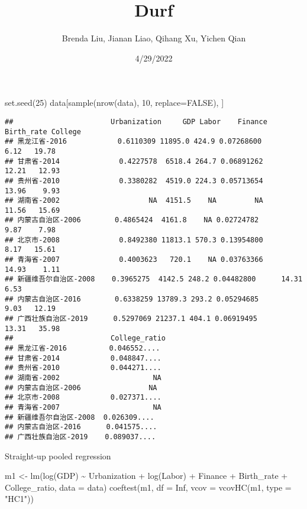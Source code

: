 \documentclass[
]{article}
\title{Durf}
\author{Brenda Liu, Jianan Liao, Qihang Xu, Yichen Qian}
\date{4/29/2022}
\newenvironment{Shaded}{\begin{snugshade}}{\end{snugshade}}
\newcommand{\AttributeTok}[1]{\textcolor[rgb]{0.77,0.63,0.00}{#1}}
\newcommand{\ConstantTok}[1]{\textcolor[rgb]{0.00,0.00,0.00}{#1}}
\newcommand{\DecValTok}[1]{\textcolor[rgb]{0.00,0.00,0.81}{#1}}
\newcommand{\FunctionTok}[1]{\textcolor[rgb]{0.00,0.00,0.00}{#1}}
\newcommand{\NormalTok}[1]{#1}
\newcommand{\OtherTok}[1]{\textcolor[rgb]{0.56,0.35,0.01}{#1}}
\newcommand{\SpecialCharTok}[1]{\textcolor[rgb]{0.00,0.00,0.00}{#1}}
\newcommand{\StringTok}[1]{\textcolor[rgb]{0.31,0.60,0.02}{#1}}
\begin{document}
\maketitle

\begin{Shaded}
\begin{Highlighting}[]
\FunctionTok{set.seed}\NormalTok{(}\DecValTok{25}\NormalTok{)}
\NormalTok{data[}\FunctionTok{sample}\NormalTok{(}\FunctionTok{nrow}\NormalTok{(data), }\DecValTok{10}\NormalTok{, }\AttributeTok{replace=}\ConstantTok{FALSE}\NormalTok{), ]}
\end{Highlighting}
\end{Shaded}

\begin{verbatim}
##                       Urbanization     GDP Labor    Finance Birth_rate College
## 黑龙江省-2016            0.6110309 11895.0 424.9 0.07268600       6.12   19.78
## 甘肃省-2014              0.4227578  6518.4 264.7 0.06891262      12.21   12.93
## 贵州省-2010              0.3380282  4519.0 224.3 0.05713654      13.96    9.93
## 湖南省-2002                     NA  4151.5    NA         NA      11.56   15.69
## 内蒙古自治区-2006        0.4865424  4161.8    NA 0.02724782       9.87    7.98
## 北京市-2008              0.8492380 11813.1 570.3 0.13954800       8.17   15.61
## 青海省-2007              0.4003623   720.1    NA 0.03763366      14.93    1.11
## 新疆维吾尔自治区-2008    0.3965275  4142.5 248.2 0.04482800      14.31    6.53
## 内蒙古自治区-2016        0.6338259 13789.3 293.2 0.05294685       9.03   12.19
## 广西壮族自治区-2019      0.5297069 21237.1 404.1 0.06919495      13.31   35.98
##                       College_ratio
## 黑龙江省-2016          0.046552....
## 甘肃省-2014            0.048847....
## 贵州省-2010            0.044271....
## 湖南省-2002                      NA
## 内蒙古自治区-2006                NA
## 北京市-2008            0.027371....
## 青海省-2007                      NA
## 新疆维吾尔自治区-2008  0.026309....
## 内蒙古自治区-2016      0.041575....
## 广西壮族自治区-2019    0.089037....
\end{verbatim}

\newpage

Straight-up pooled regression

\begin{Shaded}
\begin{Highlighting}[]
\NormalTok{m1 }\OtherTok{\textless{}{-}} \FunctionTok{lm}\NormalTok{(}\FunctionTok{log}\NormalTok{(GDP) }\SpecialCharTok{\textasciitilde{}}\NormalTok{ Urbanization }\SpecialCharTok{+} \FunctionTok{log}\NormalTok{(Labor) }\SpecialCharTok{+}\NormalTok{ Finance }\SpecialCharTok{+}\NormalTok{ Birth\_rate }\SpecialCharTok{+}\NormalTok{ College\_ratio, }
         \AttributeTok{data =}\NormalTok{ data)}
\FunctionTok{coeftest}\NormalTok{(m1, }\AttributeTok{df =} \ConstantTok{Inf}\NormalTok{, }\AttributeTok{vcov =} \FunctionTok{vcovHC}\NormalTok{(m1, }\AttributeTok{type =} \StringTok{"HC1"}\NormalTok{))}
\end{Highlighting}
\end{Shaded}
\end{document}
